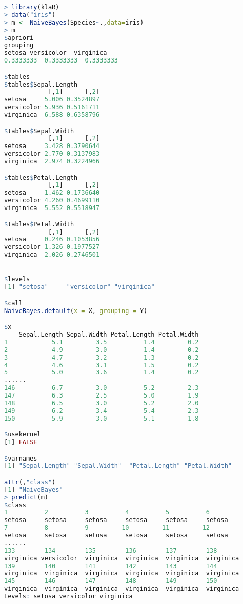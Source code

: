 \documentclass[11pt,a4paper,oneside]{book}
\begin{document}
\begin{lstlisting}[language=r]
> library(klaR)
> data("iris")
> m <- NaiveBayes(Species~.,data=iris)
> m
$apriori
grouping
setosa versicolor  virginica 
0.3333333  0.3333333  0.3333333 

$tables
$tables$Sepal.Length
            [,1]      [,2]
setosa     5.006 0.3524897
versicolor 5.936 0.5161711
virginica  6.588 0.6358796

$tables$Sepal.Width
            [,1]      [,2]
setosa     3.428 0.3790644
versicolor 2.770 0.3137983
virginica  2.974 0.3224966

$tables$Petal.Length
            [,1]      [,2]
setosa     1.462 0.1736640
versicolor 4.260 0.4699110
virginica  5.552 0.5518947

$tables$Petal.Width
            [,1]      [,2]
setosa     0.246 0.1053856
versicolor 1.326 0.1977527
virginica  2.026 0.2746501


$levels
[1] "setosa"     "versicolor" "virginica" 

$call
NaiveBayes.default(x = X, grouping = Y)

$x
    Sepal.Length Sepal.Width Petal.Length Petal.Width
1            5.1         3.5          1.4         0.2
2            4.9         3.0          1.4         0.2
3            4.7         3.2          1.3         0.2
4            4.6         3.1          1.5         0.2
5            5.0         3.6          1.4         0.2
......
146          6.7         3.0          5.2         2.3
147          6.3         2.5          5.0         1.9
148          6.5         3.0          5.2         2.0
149          6.2         3.4          5.4         2.3
150          5.9         3.0          5.1         1.8

$usekernel
[1] FALSE

$varnames
[1] "Sepal.Length" "Sepal.Width"  "Petal.Length" "Petal.Width" 

attr(,"class")
[1] "NaiveBayes"
> predict(m)
$class
1          2          3          4          5          6 
setosa     setosa     setosa     setosa     setosa     setosa 
7          8          9         10         11         12 
setosa     setosa     setosa     setosa     setosa     setosa 
......
133        134        135        136        137        138 
virginica versicolor  virginica  virginica  virginica  virginica 
139        140        141        142        143        144 
virginica  virginica  virginica  virginica  virginica  virginica 
145        146        147        148        149        150 
virginica  virginica  virginica  virginica  virginica  virginica 
Levels: setosa versicolor virginica


\end{lstlisting}
\end{document}
